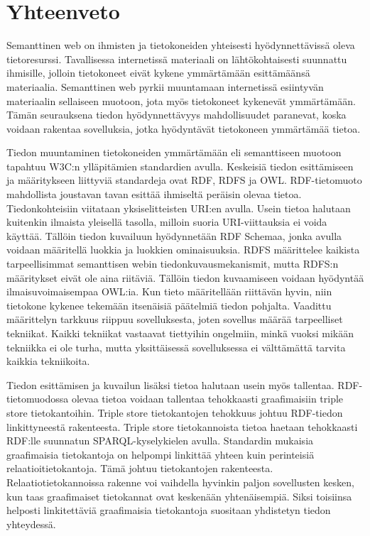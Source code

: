\documentclass[finnish, 12pt, a4paper, elec, utf8, pdfa, online]{aaltothesis}
\begin{document}
{%
\section{Yhteenveto}


Semanttinen web on ihmisten ja tietokoneiden yhteisesti hyödynnettävissä oleva tietoresurssi. Tavallisessa internetissä materiaali on lähtökohtaisesti suunnattu ihmisille, jolloin tietokoneet eivät kykene ymmärtämään esittämäänsä materiaalia. Semanttinen web pyrkii muuntamaan internetissä esiintyvän materiaalin sellaiseen muotoon, jota myös tietokoneet kykenevät ymmärtämään. Tämän seurauksena tiedon hyödynnettävyys mahdollisuudet paranevat, koska voidaan rakentaa sovelluksia, jotka hyödyntävät tietokoneen ymmärtämää tietoa.

Tiedon muuntaminen tietokoneiden ymmärtämään eli semanttiseen muotoon tapahtuu W3C:n ylläpitämien standardien avulla. Keskeisiä tiedon esittämiseen ja määritykseen liittyviä standardeja ovat RDF, RDFS ja OWL. RDF-tietomuoto mahdollista joustavan tavan esittää ihmiseltä peräisin olevaa tietoa. Tiedonkohteisiin viitataan yksiselitteisten URI:en avulla. Usein tietoa halutaan kuitenkin ilmaista yleisellä tasolla, milloin suoria URI-viittauksia ei voida käyttää. Tällöin tiedon kuvailuun hyödynnetään RDF Schemaa, jonka avulla voidaan määritellä luokkia ja luokkien ominaisuuksia. RDFS määrittelee kaikista tarpeellisimmat semanttisen webin tiedonkuvausmekanismit, mutta RDFS:n määritykset eivät ole aina riitäviä. Tällöin tiedon kuvaamiseen voidaan hyödyntää ilmaisuvoimaisempaa OWL:ia. Kun tieto määritellään riittävän hyvin, niin tietokone kykenee tekemään itsenäisiä päätelmiä tiedon pohjalta. Vaadittu määrittelyn tarkkuus riippuu sovelluksesta, joten sovellus määrää tarpeelliset tekniikat. Kaikki tekniikat vastaavat tiettyihin ongelmiin, minkä vuoksi mikään tekniikka ei ole turha, mutta yksittäisessä sovelluksessa ei välttämättä tarvita kaikkia tekniikoita.

Tiedon esittämisen ja kuvailun lisäksi tietoa halutaan usein myös tallentaa. RDF-tietomuodossa olevaa tietoa voidaan tallentaa tehokkaasti graafimaisiin triple store tietokantoihin. Triple store tietokantojen tehokkuus johtuu RDF-tiedon linkittyneestä rakenteesta. Triple store tietokannoista tietoa haetaan tehokkaasti RDF:lle suunnatun SPARQL-kyselykielen avulla. Standardin mukaisia graafimaisia tietokantoja on helpompi linkittää yhteen kuin perinteisiä relaatioitietokantoja. Tämä johtuu tietokantojen rakenteesta. Relaatiotietokannoissa rakenne voi vaihdella hyvinkin paljon sovellusten kesken, kun taas graafimaiset tietokannat ovat keskenään yhtenäisempiä. Siksi toisiinsa helposti linkitettäviä graafimaisia tietokantoja suositaan yhdistetyn tiedon yhteydessä.

}
\end{document}
